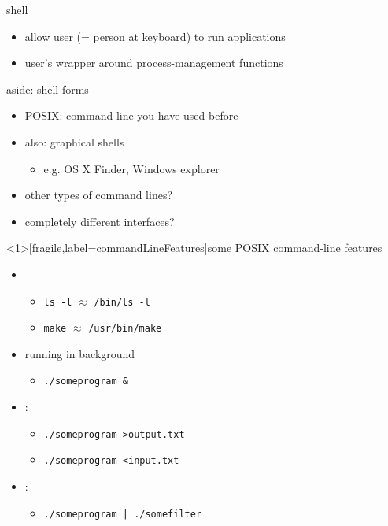 \begin{frame}{shell}
\begin{itemize}
    \item allow user (= person at keyboard) to run applications
    \item user's wrapper around process-management functions
\end{itemize}
\end{frame}

\begin{frame}{aside: shell forms}
\begin{itemize}
    \item POSIX: command line you have used before
        \vspace{.5cm}
    \item also: graphical shells
        \begin{itemize}
        \item e.g. OS X Finder, Windows explorer
        \end{itemize}
    \item other types of command lines?
    \item completely different interfaces?
\end{itemize}
\end{frame}

\begin{frame}<1>[fragile,label=commandLineFeatures]{some POSIX command-line features}
\begin{itemize}
\item {}
    \begin{itemize}
    \item \verb|ls -l| $\approx$ \verb|/bin/ls -l|
    \item \verb|make| $\approx$ \verb|/usr/bin/make|
    \end{itemize}
\item running in background
    \begin{itemize}
    \item \verb|./someprogram &|
    \end{itemize}
\item {}:
    \begin{itemize}
    \item \verb|./someprogram >output.txt|
    \item \verb|./someprogram <input.txt|
    \end{itemize}
\item {}:
    \begin{itemize}
    \item \verb!./someprogram | ./somefilter!
    \end{itemize}
\end{itemize}
\end{frame}

